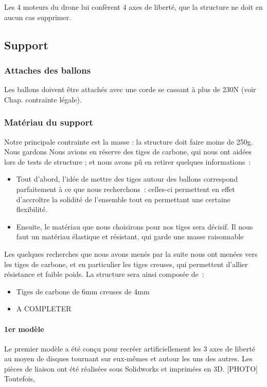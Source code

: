 \documentclass[a4paper,11pt]{article}
\begin{document}
Les 4 moteurs du drone lui confèrent 4 axes de liberté, que la structure ne doit en aucun cas supprimer.

\subsection{Support}

\subsubsection{Attaches des ballons}

Les ballons doivent être attachés avec une corde se cassant à plus de 230N (voir Chap. contrainte légale).

\subsubsection{Matériau du support}
Notre principale contrainte est la masse : la structure doit faire moins de 250g. Nous gardons
Nous avions en réserve des tiges de carbone, qui nous ont aidées lors de tests de structure ; et nous avons pû en retirer quelques informations~:
\begin{itemize}
        \item Tout d'abord, l'idée de mettre des tiges autour des ballons correspond parfaitement à ce que nous recherchons~: celles-ci permettent en effet d'accroître la solidité de l'ensemble tout en permettant une certaine flexibilité.
        \item Ensuite, le matériau que nous choisirons pour nos tiges sera décisif. Il nous faut un matériau élastique et résistant, qui garde une masse raisonnable
\end{itemize}
Les quelques recherches que nous avons menés par la suite nous ont menées vers les tiges de carbone, et en particulier les tiges creuses, qui permettent d'allier résistance et faible poids.
La structure sera ainsi composée de~:
\begin{itemize}
        \item Tiges de carbone de 6mm creuses de 4mm
        \item A COMPLETER
\end{itemize}

\paragraph{1er modèle}

Le premier modèle a été conçu pour recréer artificiellement les 3 axes de liberté au moyen de disques tournant sur eux-mêmes et autour les uns des autres. Les pièces de liaison ont été réalisées sous Solidworks et imprimées en 3D.
[PHOTO]
Toutefois,
\end{document}
